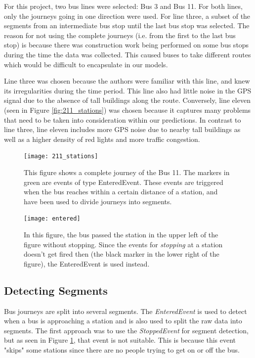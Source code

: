 For this project, two bus lines were selected: Bus 3 and Bus 11. For both lines, only the journeys going in one direction were used. For line three, a subset of the segments from an intermediate bus stop until the last bus stop was selected. The reason for not using the complete journeys (i.e. from the first to the last bus stop) is because there was construction work being performed on some bus stops during the time the data was collected. This caused buses to take different routes which would be difficult to encapsulate in our models.

Line three was chosen because the authors were familiar with this line, and knew its irregularities during the time period. This line also had little noise in the GPS signal due to the absence of tall buildings along the route. Conversely, line eleven (seen in Figure \ref{fig:211_stations}) was chosen because it captures many problems that need to be taken into consideration within our predictions.  In contrast to line three, line eleven includes more GPS noise due to nearby tall buildings as well as a higher density of red lights and more traffic congestion.

\begin{figure}[!b]
\begin{minipage}{.5\textwidth}
    \texttt{[image: 211\_stations]}
    \caption{This figure shows a complete journey of the Bus 11. The markers in green are events of type EnteredEvent. These events are triggered when the bus reaches within a certain distance of a station, and have been used to divide journeys into segments.}
    \label{fig:211_stations}
\end{minipage}
\hspace{5pt}
\begin{minipage}{.48\textwidth}
\texttt{[image: entered]}
\caption{In this figure, the bus passed the station in the upper left of the figure without stopping. Since the events for \textit{stopping} at a station doesn't get fired then (the black marker in the lower right of the figure), the EnteredEvent is used instead.}
\label{fig:entered}
\end{minipage}
\end{figure}


\subsection{Detecting Segments}
Bus journeys are split into several segments. The \textit{EnteredEvent} is used to detect when a bus is approaching a station and is also used to split the raw data into segments. The first approach was to use the \textit{StoppedEvent} for segment detection, but as seen in Figure \ref{fig:entered}, that event is not suitable. This is because this event "skips" some stations since there are no people trying to get on or off the bus.

